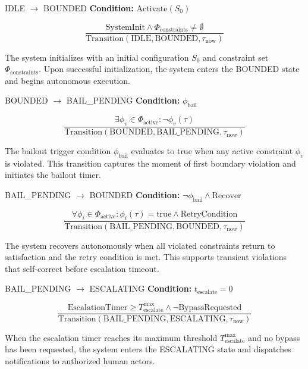 \begin{transitionfn}{IDLE $\rightarrow$ BOUNDED}
\textbf{Condition:} $\text{Activate}(S_0)$

\[
\frac{\text{SystemInit} \land \Phi_{\text{constraints}} \neq \emptyset}{\text{Transition}(\text{IDLE}, \text{BOUNDED}, \tau_{\text{now}})}
\]

The system initializes with an initial configuration $S_0$ and constraint set $\Phi_{\text{constraints}}$. Upon successful initialization, the system enters the BOUNDED state and begins autonomous execution.
\end{transitionfn}

\begin{transitionfn}{BOUNDED $\rightarrow$ BAIL\_PENDING}
\textbf{Condition:} $\phi_{\text{bail}}$

\[
\frac{\exists \phi_v \in \Phi_{\text{active}}: \neg\phi_v(\tau)}{\text{Transition}(\text{BOUNDED}, \text{BAIL\_PENDING}, \tau_{\text{now}})}
\]

The bailout trigger condition $\phi_{\text{bail}}$ evaluates to true when any active constraint $\phi_v$ is violated. This transition captures the moment of first boundary violation and initiates the bailout timer.
\end{transitionfn}

\begin{transitionfn}{BAIL\_PENDING $\rightarrow$ BOUNDED}
\textbf{Condition:} $\neg\phi_{\text{bail}} \land \text{Recover}$

\[
\frac{\forall \phi_i \in \Phi_{\text{active}}: \phi_i(\tau) = \text{true} \land \text{RetryCondition}}{\text{Transition}(\text{BAIL\_PENDING}, \text{BOUNDED}, \tau_{\text{now}})}
\]

The system recovers autonomously when all violated constraints return to satisfaction and the retry condition is met. This supports transient violations that self-correct before escalation timeout.
\end{transitionfn}

\begin{transitionfn}{BAIL\_PENDING $\rightarrow$ ESCALATING}
\textbf{Condition:} $t_{\text{escalate}} = 0$

\[
\frac{\text{EscalationTimer} \geq T_{\text{escalate}}^{\max} \land \neg\text{BypassRequested}}{\text{Transition}(\text{BAIL\_PENDING}, \text{ESCALATING}, \tau_{\text{now}})}
\]

When the escalation timer reaches its maximum threshold $T_{\text{escalate}}^{\max}$ and no bypass has been requested, the system enters the ESCALATING state and dispatches notifications to authorized human actors.
\end{transitionfn}

